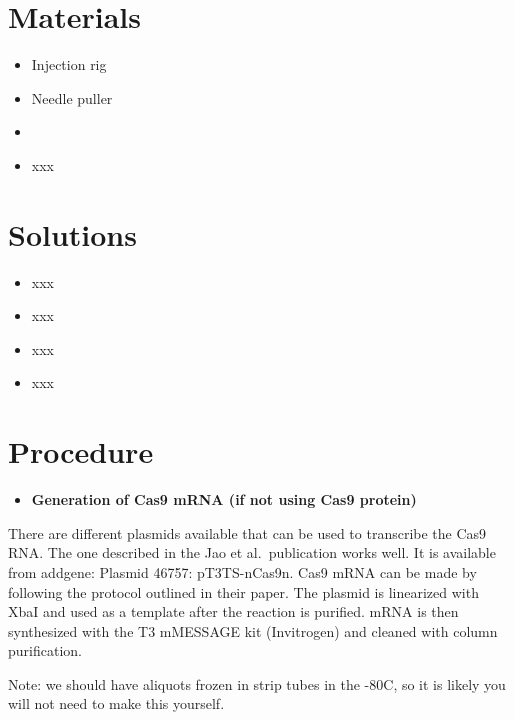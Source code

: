 \documentclass[
  letterpaper,
  DIV=11,
  numbers=noendperiod]{scrreprt}
\providecommand{\tightlist}{%
  \setlength{\itemsep}{0pt}\setlength{\parskip}{0pt}}\usepackage{longtable,booktabs,array}
\begin{document}
\hypertarget{materials-86}{%
\section{Materials}\label{materials-86}}

\begin{itemize}
\tightlist
\item
  Injection rig
\item
  Needle puller
\item
\item
  xxx
\end{itemize}

\hypertarget{solutions-78}{%
\section{Solutions}\label{solutions-78}}

\begin{itemize}
\tightlist
\item
  xxx
\item
  xxx
\item
  xxx
\item
  xxx
\end{itemize}

\hypertarget{procedure-85}{%
\section{Procedure}\label{procedure-85}}

\begin{itemize}
\tightlist
\item
  \textbf{Generation of Cas9 mRNA (if not using Cas9 protein)}
\end{itemize}

\begin{tcolorbox}[enhanced jigsaw, rightrule=.15mm, title=\textcolor{quarto-callout-note-color}{\faInfo}\hspace{0.5em}{Note}, titlerule=0mm, opacitybacktitle=0.6, toprule=.15mm, bottomrule=.15mm, opacityback=0, left=2mm, colframe=quarto-callout-note-color-frame, breakable, coltitle=black, colback=white, colbacktitle=quarto-callout-note-color!10!white, bottomtitle=1mm, leftrule=.75mm, toptitle=1mm, arc=.35mm]

There are different plasmids available that can be used to transcribe
the Cas9 RNA. The one described in the Jao et al.~publication works
well. It is available from addgene: Plasmid 46757: pT3TS-nCas9n. Cas9
mRNA can be made by following the protocol outlined in their paper. The
plasmid is linearized with XbaI and used as a template after the
reaction is purified. mRNA is then synthesized with the T3 mMESSAGE kit
(Invitrogen) and cleaned with column purification.

Note: we should have aliquots frozen in strip tubes in the -80C, so it
is likely you will not need to make this yourself.

\end{tcolorbox}
\end{document}
